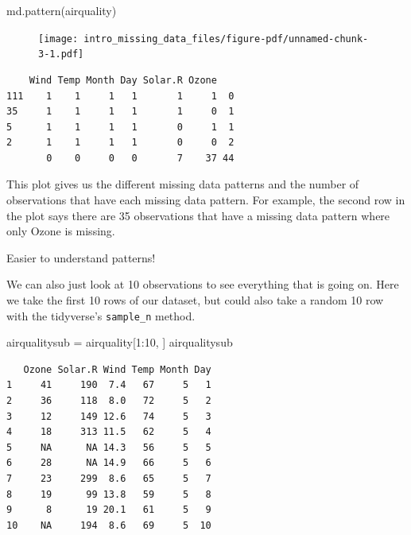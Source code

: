 \documentclass[
  letterpaper,
  DIV=11,
  numbers=noendperiod]{scrreprt}
\newenvironment{Shaded}{\begin{snugshade}}{\end{snugshade}}
\newcommand{\DecValTok}[1]{\textcolor[rgb]{0.25,0.63,0.44}{#1}}
\newcommand{\FunctionTok}[1]{\textcolor[rgb]{0.02,0.16,0.49}{#1}}
\newcommand{\NormalTok}[1]{\textcolor[rgb]{0.00,0.44,0.13}{#1}}
\newcommand{\OtherTok}[1]{\textcolor[rgb]{0.00,0.44,0.13}{#1}}
\newcommand{\SpecialCharTok}[1]{\textcolor[rgb]{0.25,0.44,0.63}{#1}}
\begin{document}
\begin{Shaded}
\begin{Highlighting}[]
  \FunctionTok{md.pattern}\NormalTok{(airquality)}
\end{Highlighting}
\end{Shaded}

\begin{figure}[H]

{\centering \texttt{[image: intro\_missing\_data\_files/figure-pdf/unnamed-chunk-3-1.pdf]}

}

\end{figure}

\begin{verbatim}
    Wind Temp Month Day Solar.R Ozone   
111    1    1     1   1       1     1  0
35     1    1     1   1       1     0  1
5      1    1     1   1       0     1  1
2      1    1     1   1       0     0  2
       0    0     0   0       7    37 44
\end{verbatim}

This plot gives us the different missing data patterns and the number of
observations that have each missing data pattern. For example, the
second row in the plot says there are 35 observations that have a
missing data pattern where only Ozone is missing.

Easier to understand patterns!

We can also just look at 10 observations to see everything that is going
on. Here we take the first 10 rows of our dataset, but could also take a
random 10 row with the tidyverse's \texttt{sample\_n} method.

\begin{Shaded}
\begin{Highlighting}[]
\NormalTok{  airqualitysub }\OtherTok{=}\NormalTok{ airquality[}\DecValTok{1}\SpecialCharTok{:}\DecValTok{10}\NormalTok{, ]}
\NormalTok{  airqualitysub}
\end{Highlighting}
\end{Shaded}

\begin{verbatim}
   Ozone Solar.R Wind Temp Month Day
1     41     190  7.4   67     5   1
2     36     118  8.0   72     5   2
3     12     149 12.6   74     5   3
4     18     313 11.5   62     5   4
5     NA      NA 14.3   56     5   5
6     28      NA 14.9   66     5   6
7     23     299  8.6   65     5   7
8     19      99 13.8   59     5   8
9      8      19 20.1   61     5   9
10    NA     194  8.6   69     5  10
\end{verbatim}
\end{document}
